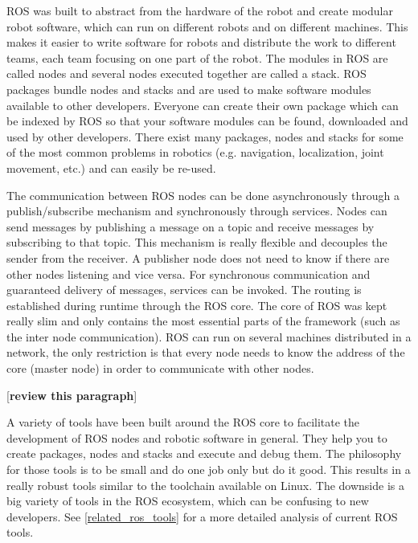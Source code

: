\begin{figure}[ht]
\centering
{}
\end{figure}

ROS was built to abstract from the hardware of the robot and create modular robot software, which can run on different robots and on different machines. This makes it easier to write software for robots and distribute the work to different teams, each team focusing on one part of the robot. The modules in ROS are called nodes and several nodes executed together are called a stack. ROS packages bundle nodes and stacks and are used to make software modules available to other developers. Everyone can create their own package which can be indexed by ROS so that your software modules can be found, downloaded and used by other developers. There exist many packages, nodes and stacks for some of the most common problems in robotics (e.g. navigation, localization, joint movement, etc.) and can easily be re-used.

The communication between ROS nodes can be done asynchronously through a publish/subscribe mechanism and synchronously through services. Nodes can send messages by publishing a message on a topic and receive messages by subscribing to that topic. This mechanism is really flexible and decouples the sender from the receiver. A publisher node does not need to know if there are other nodes listening and vice versa. For synchronous communication and guaranteed delivery of messages, services can be invoked. The routing is established during runtime through the ROS core. The core of ROS was kept really slim and only contains the most essential parts of the framework (such as the inter node communication). ROS can run on several machines distributed in a network, the only restriction is that every node needs to know the address of the core (master node) in order to communicate with other nodes.

[\textbf{review this paragraph}]

A variety of tools have been built around the ROS core to facilitate the development of ROS nodes and robotic software in general. They help you to create packages, nodes and stacks and execute and debug them. The philosophy for those tools is to be small and do one job only but do it good. This results in a really robust tools similar to the toolchain available on Linux. The downside is a big variety of tools in the ROS ecosystem, which can be confusing to new developers. See \ref{related_ros_tools} for a more detailed analysis of current ROS tools.

